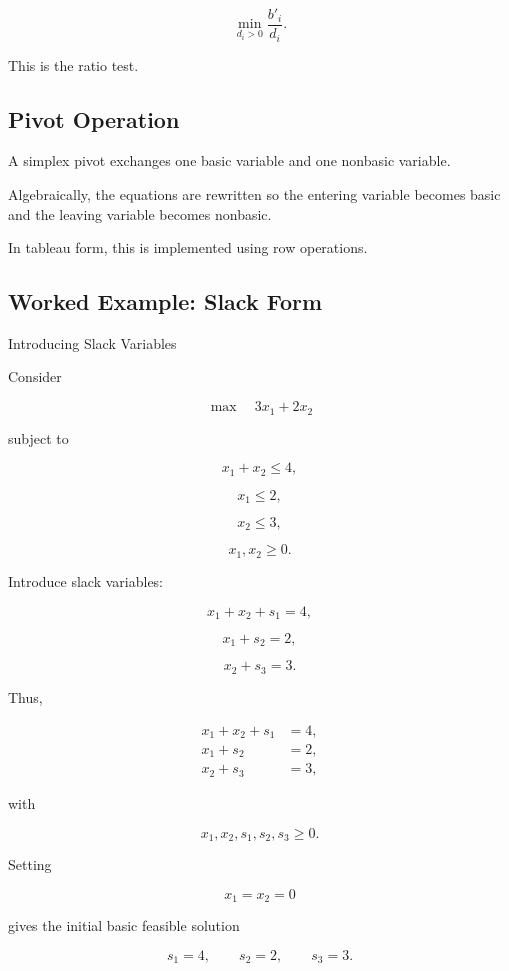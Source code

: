 \[
\boxed{
\min_{d_i>0}
\frac{
b'_i
}{
d_i
}.
}
\]

This is the ratio test.

\subsection{Pivot Operation}
\label{subsec:simplex-pivot}

A simplex pivot exchanges one basic variable and one nonbasic variable.

Algebraically, the equations are rewritten so the entering variable
becomes basic and the leaving variable becomes nonbasic.

In tableau form, this is implemented using row operations.

\subsection{Worked Example: Slack Form}
\label{subsec:worked-lp-slack-form}

\begin{workedexamplebox}{Introducing Slack Variables}

Consider

\[
\max
\quad
3x_1+2x_2
\]

subject to

\[
x_1+x_2\leq4,
\]

\[
x_1\leq2,
\]

\[
x_2\leq3,
\]

\[
x_1,x_2\geq0.
\]

Introduce slack variables:

\[
x_1+x_2+s_1=4,
\]

\[
x_1+s_2=2,
\]

\[
x_2+s_3=3.
\]

Thus,

\begin{answerbox}
\[
\boxed{
\begin{aligned}
x_1+x_2+s_1&=4,\\
x_1+s_2&=2,\\
x_2+s_3&=3,
\end{aligned}
}
\]

with

\[
\boxed{
x_1,x_2,s_1,s_2,s_3\geq0.
}
\]
\end{answerbox}

Setting

\[
x_1=x_2=0
\]

gives the initial basic feasible solution

\[
\boxed{
s_1=4,
\qquad
s_2=2,
\qquad
s_3=3.
}
\]

\end{workedexamplebox}

